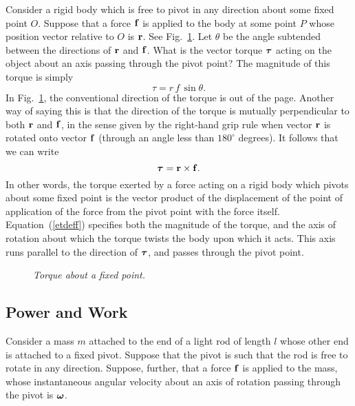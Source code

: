 Consider a rigid body which is free to pivot in any direction about some fixed point $O$.
Suppose that a force ${\bf f}$ is applied to the body at some point $P$ whose position
vector relative to $O$ is ${\bf r}$. See Fig.~\ref{f82}.
 Let $\theta$ be the angle subtended between
the directions of ${\bf r}$ and ${\bf f}$. What is the vector torque $\mbox{\boldmath$\tau$}$ acting
on the object about an axis passing through the pivot point? The magnitude of this torque is simply
\begin{equation}
\tau = r\,f\,\sin\theta.
\end{equation}
In Fig.~\ref{f82}, 
the conventional 
direction of the torque is  out of the page. Another way of saying this is that the direction
of the torque is mutually perpendicular to both ${\bf r}$ and ${\bf f}$, in the sense given by the
right-hand grip rule when vector ${\bf r}$ is rotated onto vector ${\bf f}$ (through an
angle less than $180^\circ$ degrees). 
It follows that we can write
\begin{equation}\label{etdeff}
\mbox{\boldmath$\tau$} = {\bf r}\times {\bf f}.
\end{equation}
In other words, the torque exerted by a force acting  on a rigid body which pivots about some fixed
point is the vector product of the displacement of the point of application of the force from
the pivot point with the force itself. Equation~(\ref{etdeff}) specifies both the magnitude
of the torque, and the axis of rotation about which the torque twists the body upon which
it acts. This axis runs parallel to the direction of $\mbox{\boldmath$\tau$}$, and passes through the
pivot point.

\begin{figure}
\epsfysize=3in
\centerline{}
\caption{\em Torque about a fixed point.}\label{f82}  
\end{figure}

\subsection{Power and Work}
Consider a mass $m$ attached to the end of a light rod of length $l$ whose
other end is attached to a fixed pivot. Suppose that the pivot is such that the rod
is free to rotate in any direction. Suppose, further, that a force ${\bf f}$ is
applied to the mass, whose instantaneous angular velocity about an axis of rotation passing
through the pivot is $\mbox{\boldmath$\omega$}$. 

